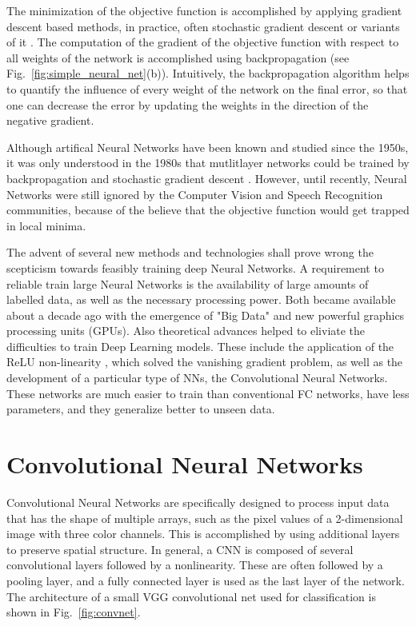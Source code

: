 The minimization of the objective function is accomplished by applying gradient descent based methods, in practice, often  stochastic gradient descent \parencite{bottou2008} or variants of it \parencite{ruder2016}. The computation of the gradient of the objective function with respect to all weights of the network is accomplished using backpropagation \parencite{rumelhart1986} (see Fig.~\ref{fig:simple_neural_net}(b)).
Intuitively, the backpropagation algorithm helps to quantify the influence of every weight of the network on the final error, so that one can decrease the error by updating the weights in the direction of the negative gradient.

Although artifical Neural Networks have been known and studied since the 1950s, it was only understood in the 1980s that mutlitlayer networks could be trained by backpropagation and stochastic gradient descent \parencite{lecun1989}. However, until recently, Neural Networks were still ignored by the Computer Vision and Speech Recognition communities, because of the believe that the objective function would get trapped in local minima. 

The advent of several new methods and technologies shall prove wrong the scepticism towards feasibly training deep Neural Networks. A requirement to reliable train large Neural Networks is the availability of large amounts of labelled data, as well as the necessary processing power. Both became available  about a decade ago with the emergence of "Big Data" and new powerful graphics processing units (GPUs).
Also theoretical advances helped to eliviate the difficulties to train Deep Learning models. These include the application of the ReLU non-linearity \parencite{glorot2011}, which solved the vanishing gradient problem, as well as the development of a particular type of NNs, the Convolutional Neural Networks. These networks are much easier to train than conventional FC networks, have less parameters, and they generalize better to unseen data. 

\section{Convolutional Neural Networks}
Convolutional Neural Networks \parencite{vaillant1993, lecun1998} are specifically designed to process input data that has the shape of multiple arrays, such as the pixel values of a 2-dimensional image with three color channels. This is accomplished by using additional layers to preserve spatial structure. In general, a CNN is composed of several convolutional layers followed by a nonlinearity. These are often followed by a pooling layer, and a fully connected layer is used as the last layer of the network. The architecture of a small VGG convolutional net \parencite{simonyan2014}  used for classification is shown in Fig.~\ref{fig:convnet}.

